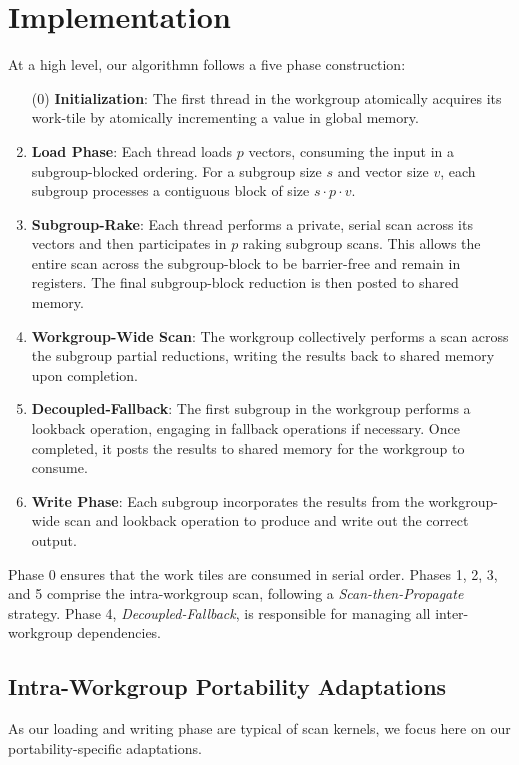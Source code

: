 \documentclass[sigconf]{acmart}
\begin{document}
\section{Implementation}
At a high level, our algorithmn follows a five phase construction:
\begin{enumerate}
  \item[(0)] \textbf {Initialization}: The first thread in the workgroup atomically acquires its work-tile by atomically incrementing a value in global memory.
  \item \textbf{Load Phase}: Each thread loads $p$ vectors, consuming the input in a subgroup-blocked ordering. For a subgroup size $s$ and vector size $v$, each subgroup processes a contiguous block of size $s \cdot p \cdot v$.
  \item \textbf{Subgroup-Rake}: Each thread performs a private, serial scan across its vectors and then participates in $p$ raking subgroup scans. This allows the entire scan across the subgroup-block to be barrier-free and remain in registers. The final subgroup-block reduction is then posted to shared memory.
  \item \textbf{Workgroup-Wide Scan}: The workgroup collectively performs a scan across the subgroup partial reductions, writing the results back to shared memory upon completion.
  \item \textbf{Decoupled-Fallback}: The first subgroup in the workgroup performs a lookback operation, engaging in fallback operations if necessary. Once completed, it posts the results to shared memory for the workgroup to consume.
  \item \textbf{Write Phase}: Each subgroup incorporates the results from the workgroup-wide scan and lookback operation to produce and write out the correct output.
\end{enumerate}
Phase 0 ensures that the work tiles are consumed in serial order. Phases 1, 2, 3, and 5 comprise the intra-workgroup scan, following a \emph{Scan-then-Propagate} strategy. Phase 4, \emph{Decoupled-Fallback}, is responsible for managing all inter-workgroup dependencies.

\subsection{Intra-Workgroup Portability Adaptations}
As our loading and writing phase are typical of scan kernels, we focus here on our portability-specific adaptations.
\end{document}
